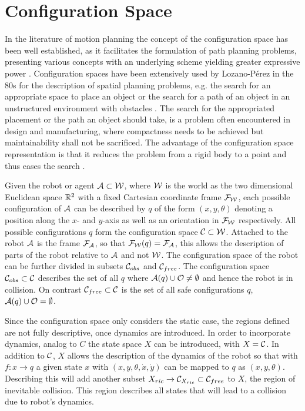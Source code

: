 \section{Configuration Space}
In the literature of motion planning the concept of the configuration space has been well established, as it facilitates the formulation of path planning problems, presenting various concepts with an underlying scheme yielding greater expressive power \cite{LaValle.2006,Latombe.1991}. Configuration spaces have been extensively used by Lozano-P\'{e}rez in the 80s for the description of spatial planning problems, e.g. the search for an appropriate space to place an object or the search for a path of an object in an unstructured environment with obstacles \cite{Latombe.1991}. The search for the appropriated placement or the path an object should take, is a problem often encountered in design and manufacturing, where compactness needs to be achieved but maintainability shall not be sacrificed. The advantage of the configuration space representation is that it reduces the problem from a rigid body to a point and thus eases the search \cite{LozanoPerez.1983}.

Given the robot or agent $\mathcal{A} \subset \mathcal{W}$, where $\mathcal{W}$ is the world as the two dimensional Euclidean space $\mathbb{R}^2$ with a fixed Cartesian coordinate frame $\mathcal{F}_{\mathcal{W}}$, each possible configuration of $\mathcal{A}$ can be described by $q$ of the form $(x,y,\theta)$ denoting a position along the $x$- and $y$-axis as well as an orientation in $\mathcal{F}_{\mathcal{W}}$ respectively. All possible configurations $q$ form the configuration space $\mathcal{C} \subset \mathcal{W}$. Attached to the robot $\mathcal{A}$ is the frame $\mathcal{F}_{\mathcal{A}}$, so that $\mathcal{F}_{\mathcal{W}}(q) = \mathcal{F}_{\mathcal{A}}$, this allows the description of parts of the robot relative to $\mathcal{A}$ and not $\mathcal{W}$. The configuration space of the robot can be further divided in subsets $\mathcal{C}_{obs}$ and $\mathcal{C}_{free}$. The configuration space $\mathcal{C}_{obs} \subset \mathcal{C}$ describes the set of all $q$ where $\mathcal{A}(q) \cup \mathcal{O} \neq \emptyset$ and hence the robot is in collision. On contrast $\mathcal{C}_{free} \subset \mathcal{C}$ is the set of all safe configurations $q$, $\mathcal{A}(q) \cup \mathcal{O} = \emptyset$. \cite{LaValle.2006,Latombe.1991}

Since the configuration space only considers the static case, the regions defined are not fully descriptive, once dynamics are introduced. In order to incorporate dynamics, analog to $C$ the state space $X$ can be introduced, with $X = \mathcal{C}$. In addition to $\mathcal{C}$, $X$ allows the description of the dynamics of the robot so that with $f: x \to q$ a given state $x$ with $(x,y,\theta,\dot{x},\dot{y})$ can be mapped to $q$ as $(x,y,\theta)$. Describing this will add another subset $X_{ric} \to \mathcal{C}_{X_{ric}} \subset \mathcal{C}_{free}$ to $X$, the region of inevitable collision. This region describes all states that will lead to a collision due to robot's dynamics. \cite{LaValle.2006,Latombe.1991}

